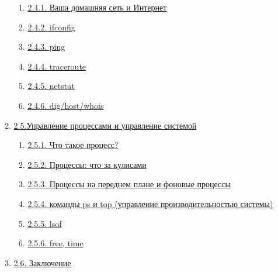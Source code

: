 \documentclass{report}
\begin{document}
\begin{enumerate}
\begin{enumerate}
    \begin{enumerate}
    \tightlist
    \item
      \protect\hyperlink{Your-home-network-and-the-internet}{{2.4.1.}
      {Ваша домашняя сеть и Интернет}}
    \item
      \protect\hyperlink{ifconfig}{{2.4.2.} {ifconfig}}
    \item
      \protect\hyperlink{ping}{{2.4.3.} {ping}}
    \item
      \protect\hyperlink{traceroute}{{2.4.4.} {traceroute}}
    \item
      \protect\hyperlink{netstat}{{2.4.5.} {netstat}}
    \item
      \protect\hyperlink{dig-host-whois}{{2.4.6.} {dig/host/whois}}
    \end{enumerate}
  \item
    \protect\hyperlink{Process-Management-and-System-Management}{{2.5.}{Управление
    процессами и управление системой}}

    \begin{enumerate}
    \tightlist
    \item
      \protect\hyperlink{What-is-a-Process}{{2.5.1.} {Что такое
      процесс?}}
    \item
      \protect\hyperlink{Processes-Behind-the-Scenes}{{2.5.2.}
      {Процессы: что за кулисами}}
    \item
      \protect\hyperlink{Foreground-vs-Background-Processes}{{2.5.3.}
      {Процессы на переднем плане и фоновые процессы}}
    \item
      \protect\hyperlink{ps-and-top-commands-system-performance-management}{{2.5.4.}
      {команды ps и top (управление производительностью системы)}}
    \item
      \protect\hyperlink{lsof}{{2.5.5.} {lsof}}
    \item
      \protect\hyperlink{free-time}{{2.5.6.} {free, time}}
    \end{enumerate}
  \item
    \protect\hyperlink{Conclusion}{{2.6.} {Заключение}}
  \end{enumerate}
\end{enumerate}
\end{document}
